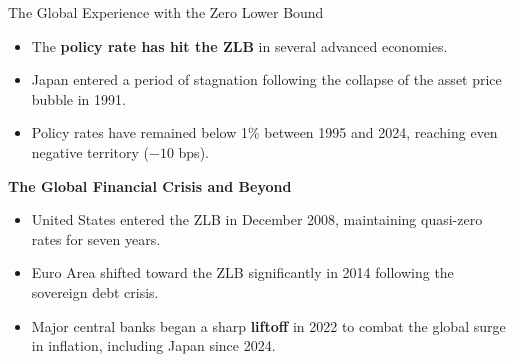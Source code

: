 \documentclass[11pt,aspectratio=169]{beamer}
\begin{document}
\begin{frame}{The Global Experience with the Zero Lower Bound}
\small

\begin{itemize}
  \item The \textbf{policy rate has hit the ZLB} in several advanced economies.
    \item Japan entered a period of stagnation following the collapse of the asset price bubble in 1991.
    \item Policy rates have remained below 1\% between 1995 and 2024, reaching even negative territory ($-10$ bps).
\end{itemize}

\vspace{0.2cm}

\textbf{The Global Financial Crisis and Beyond}
\begin{itemize}
    \item United States entered the ZLB in December 2008, maintaining quasi-zero rates for seven years.
    \item Euro Area shifted toward the ZLB significantly in 2014 following the sovereign debt crisis.
    \item Major central banks began a sharp \textbf{liftoff} in 2022 to combat the global surge in inflation, including Japan since 2024.
\end{itemize}

\end{frame}
\end{document}
